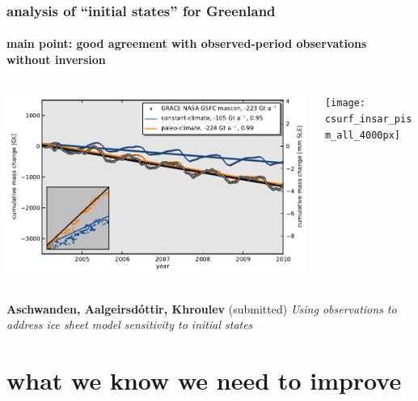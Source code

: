 \documentclass[hide notes,intlimits]{beamer}
\begin{document}
\begin{frame}
  \frametitle{analysis of ``initial states'' for Greenland}
  \framesubtitle{main point: good agreement with observed-period observations without inversion}

  \begin{columns}
  \begin{column}{0.6\textwidth}
    \includegraphics[width=1.0\textwidth]{ts_mass_2004-2009}
  \end{column}
  \begin{column}{0.4\textwidth}
    \texttt{[image: csurf\_insar\_pism\_all\_4000px]}
  \end{column}
  \end{columns}

  \begin{flushleft}
  \tiny \textbf{Aschwanden, A{\dh}algeirsd{\'o}ttir, Khroulev} (submitted) \emph{Using observations to address ice sheet model sensitivity to initial states}
 \end{flushleft}
\end{frame}


\section[to improve]{what we know we need to improve}
\end{document}
